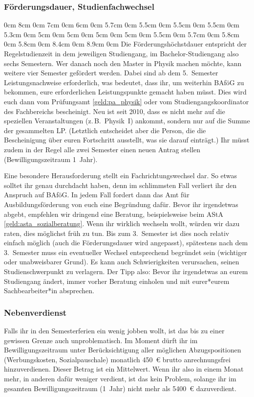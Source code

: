 \begin{multicols*}{2}
\subsubsection{Förderungsdauer, Studienfachwechsel}
0cm \columnwidth
0cm \columnwidth
0cm \columnwidth
0cm \columnwidth
0cm \columnwidth
0cm \columnwidth
0cm 8cm
0cm 7cm
0cm 6cm
0cm 5.7cm
0cm 5.5cm
0cm 5.5cm
0cm 5.5cm
0cm 5.3cm
0cm 5cm
0cm 5cm
0cm 5cm
0cm 5cm
0cm 5.5cm
0cm 5.7cm
0cm 5.8cm
0cm 5.8cm
0cm 8.4cm
0cm 8.9cm
0cm \columnwidth
Die Förderungshöchstdauer entspricht der Regelstudienzeit in dem jeweiligen Studiengang, im Bachelor-Studiengang also sechs Semestern.
Wer danach noch den Master in Physik machen möchte, kann weitere vier Semester gefördert werden.
Dabei sind ab dem 5.~Semester Leistungsnachweise erforderlich, was bedeutet, dass ihr, um weiterhin BAföG zu bekommen, eure erforderlichen Leistungspunkte gemacht haben müsst.
Dies wird euch dann vom Prüfungsamt \cref{geld:pa_physik} oder vom Studiengangskoordinator des Fachbereichs bescheinigt.
Neu ist seit 2010, dass es nicht mehr auf die speziellen Veranstaltungen (z.\,B.\ Physik~I) ankommt, sondern nur auf die Summe der gesammelten LP.
(Letztlich entscheidet aber die Person, die die Bescheinigung über euren Fortschritt ausstellt, was sie darauf einträgt.)
Ihr müsst zudem in der Regel alle zwei Semester einen neuen Antrag stellen (Bewilligungszeitraum 1~Jahr).

Eine besondere Herausforderung stellt ein Fachrichtungswechsel dar.
So etwas solltet ihr genau durchdacht haben, denn im schlimmsten Fall verliert ihr den Anspruch auf BAföG.
In jedem Fall fordert dann das Amt für Ausbildungsförderung von euch eine Begründung dafür.
Bevor ihr irgendetwas abgebt, empfehlen wir dringend eine Beratung, beispielsweise beim AStA \cref{geld:asta_sozialberatung}.
Wenn ihr wirklich wechseln wollt, würden wir dazu raten, dies möglichst früh zu tun.
Bis zum 3.~Semester ist dies noch relativ einfach möglich (auch die Förderungsdauer wird angepasst), spätestens nach dem 3.~Semester muss ein eventueller Wechsel entsprechend begründet sein (wichtiger oder unabweisbarer Grund).
Es kann auch Schwierigkeiten verursachen, seinen Studienschwerpunkt zu verlagern.
Der Tipp also:
Bevor ihr irgendetwas an eurem Studiengang ändert, immer vorher Beratung einholen und mit eurer*eurem Sachbearbeiter*in absprechen.

\subsubsection{Nebenverdienst}
Falls ihr in den Semesterferien ein wenig jobben wollt, ist das bis zu einer gewissen Grenze auch unproblematisch.
Im Moment dürft ihr im Bewilligungszeitraum unter Berücksichtigung aller möglichen Abzugspositionen (Werbungskosten, Sozialpauschale) monatlich \SI{450}{\euro} brutto anrechnungsfrei hinzuverdienen.
Dieser Betrag ist ein Mittelwert.
Wenn ihr also in einem Monat mehr, in anderen dafür weniger verdient, ist das kein Problem, solange ihr im gesamten Bewilligungszeitraum (1~Jahr) nicht mehr als \SI{5400}{\euro} dazuverdient.


\end{multicols*}

